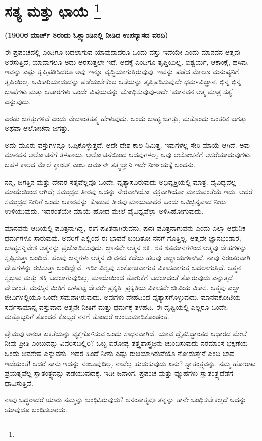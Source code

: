 
\chapter[ಸತ್ಯ ಮತ್ತು ಛಾಯೆ ]{ಸತ್ಯ ಮತ್ತು ಛಾಯೆ \protect\footnote{}}

\centerline{\textbf{(1900ರ ಮಾರ್ಚ್​ 8ರಂದು ಓಕ್ಲ್ಯಾಂಡಿನಲ್ಲಿ ನೀಡಿದ ಉಪನ್ಯಾಸದ ವರದಿ)}}

ಈ ಪ್ರಪಂಚದಲ್ಲಿ ಎಂದಿಗೂ ಬದಲಾಗುವ ಯಾವುದಾದರೂ ಒಂದು ವಸ್ತು ಇದೆಯೇ ಎಂದು ಮಾನವನ ಆತ್ಮವು ಅರಸುತ್ತಿದೆ; ಯಾವಾಗಲೂ ಅದು ಅರಸುತ್ತಲೇ ಇದೆ. ಅದಕ್ಕೆ ಎಂದಿಗೂ ತೃಪ್ತಿಯಿಲ್ಲ. ಐಶ್ವರ್ಯ, ಆಕಾಂಕ್ಷೆ, ಹಸಿವು, ಇವನ್ನು ಎಷ್ಟು ತೃಪ್ತಿಪಡಿಸಿದರೂ ಅವು ಇನ್ನೂ ವೃದ್ಧಿಯಾಗುತ್ತಿರುವುವು. ಇವನ್ನು ಪಡೆದ ಮೇಲೂ ಮನುಷ್ಯನಿಗೆ ತೃಪ್ತಿಯಿಲ್ಲ. ಅವಿಕಾರಿಯಾದುದನ್ನು ಪಡೆಯಬೇಕೆಂಬ ಆಸೆಯನ್ನು ತೃಪ್ತಿಪಡಿಸುವುದೇ ಧರ್ಮವಿಜ್ಞಾನ. ಭಿನ್ನ ಭಿನ್ನ ಭಾಷೆಗಳು ಮತ್ತು ಆಚಾರಗಳು ಒಂದೇ ವಿಷಯವನ್ನು ಬೋಧಿಸುವುವು-ಅದೇ ‘ಮಾನವನ ಆತ್ಮ ಮಾತ್ರ ಸತ್ಯ’ ಎನ್ನುವುದು.

ಎರಡು ಜಗತ್ತುಗಳಿವೆ ಎಂದು ವೇದಾಂತತತ್ತ್ವ ಹೇಳುವುದು. ಒಂದು ಬಾಹ್ಯ ಜಗತ್ತು, ಮತ್ತೊಂದು ಆಂತರಿಕ ಜಗತ್ತು ಅಥವಾ ಆಲೋಚನಾ ಜಗತ್ತು.

ಅದು ಮೂರು ವಸ್ತುಗಳನ್ನೂ ಒಪ್ಪಿಕೊಳ್ಳುತ್ತದೆ. ಅದೇ ದೇಶ ಕಾಲ ನಿಮಿತ್ತ. ಇವುಗಳೆಲ್ಲ ಸೇರಿ ಮಾಯೆ ಆಗಿದೆ. ಅವು ಮಾನವನ ಆಲೋಚನೆಗೆ ತಳಪಾಯ. ಆಲೋಚನೆಯಿಂದ ಆದವುಗಳಲ್ಲ, ಅವು ಆಲೋಚನೆಗೆ ಆಸರೆಯಾದುವುಗಳು. ಬಹಳ ಕಾಲದ ಮೇಲೆ ಕ್ಯಾಂಟ್​ ಎಂಬ ಜರ್ಮನ್​ ತತ್ತ್ವಜ್ಞಾನಿ ಇದೇ ನಿರ್ಣಯಕ್ಕೆ ಬಂದನು.

ನನ್ನ, ಜಗತ್ತಿನ ಮತ್ತು ದೇವರ ಸತ್ಯವೆಲ್ಲವೂ ಒಂದೇ. ವ್ಯತ್ಯಾಸವಿರುವುದು ಅಭಿವ್ಯಕ್ತಿಯಲ್ಲಿ ಮಾತ್ರ. ವೈವಿಧ್ಯವೆಲ್ಲ ಮಾಯೆಯಿಂದ ಆಗಿದೆ; ಸಮುದ್ರದ ತೀರವು ಅದನ್ನು ನೇರವಾಗಿಯೋ ವಕ್ರವಾಗಿಯೋ ಮಾಡುವಂತೆಯೆ ಇದು. ಆದರೆ ಸಮುದ್ರದ ನೀರಿಗೆ ಒಂದು ಆಕಾರವನ್ನು ಕೊಡುವ ತೀರವು ಮಾಯವಾದರೆ ಒಂದು ಅವಿಚ್ಛಿನ್ನವಾದ ನೀರು ಉಳಿಯುವುದು. ಇದರಂತೆಯೇ ಮಾಯೆ ಹೋದ ಮೇಲೆ ವೈವಿಧ್ಯವೆಲ್ಲಾ ಅಳಿಸಿ\break ಹೋಗುವುದು.

ಮಾನವನು ಆದಿಯಲ್ಲಿ ಪವಿತ್ರನಾಗಿದ್ದ, ಈಗ ಪತಿತನಾಗಿರುವನು, ಪುನಃ ಪವಿತ್ರನಾಗುವನು ಎಂದು ಎಲ್ಲಾ ಆಧುನಿಕ ಧರ್ಮಗಳೂ ಸಾರುವುವು. ಅವರಿಗೆ ಎಲ್ಲಿಂದ ಈ ಭಾವನೆ ಬಂದಿತೋ ನನಗೆ ಗೊತ್ತಿಲ್ಲ. ಆತ್ಮವೇ ಜ್ಞಾನಭಂಡಾರ; ಬಾಹ್ಯಸನ್ನಿವೇಶ ಆತ್ಮನನ್ನು ಪ್ರಚೋದಿಸುವುದು. ಜ್ಞಾನವೇ ಆತ್ಮನ ಶಕ್ತಿ. ಶತ ಶತಮಾನಗಳಿಂದ ಆತ್ಮವು ದೇಹಗಳನ್ನು ಸೃಷ್ಟಿಸುತ್ತಾ ಬಂದಿದೆ. ಹಲವು ಜನ್ಮಗಳು ಆತ್ಮನ ಜೀವನದ ಕಥೆಯ ಹಲವು ಅಧ್ಯಾಯಗಳಾಗಿವೆ. ನಾವು ನಿರಂತರವಾಗಿ ದೇಹಗಳನ್ನು ರಚಿಸುತ್ತಾ ಬಂದಿದ್ದೇವೆ. ಇಡೀ ವಿಶ್ವವು ಸಂಕೋಚವಾಗುತ್ತ ವಿಕಾಸವಾಗುತ್ತ ಬದಲಾಗುತ್ತಿದೆ. ಆತ್ಮನ ಸ್ವಭಾವ ಮತ್ತು ಶಕ್ತಿ ಬದಲಾಗುವುದಿಲ್ಲ. ಮಾಯೆಯಿಂದ ತೋರಿಕೆಗೆ ಬದಲಾದಂತೆ ತೋರುವುದು ಎನ್ನುತ್ತದೆ ವೇದಾಂತ. ಮನಸ್ಸಿನ ಮಿತಿಗೆ ಒಳಪಟ್ಟ ದೇವರೇ ಪ್ರಕೃತಿ. ಪ್ರಕೃತಿಯ ವಿಕಾಸವೇ ಜೀವಿಯ ವಿಕಾಸ. ಆತ್ಮವು ಎಲ್ಲಾ ಜೀವಿಗಳಲ್ಲಿಯೂ ಒಂದೇ ಸಮನಾಗಿರುವುದು. ಅವುಗಳು ದೇಹದಿಂದ ವ್ಯತ್ಯಾಸಗೊಳ್ಳುವುದು. ಮಾನವಕೋಟಿಯ ಸರ್ವಸಾಮಾನ್ಯ ವಸ್ತುವಾದ ಆತ್ಮನೇ ನೀತಿಗೆ ಮತ್ತು ಧರ್ಮಕ್ಕೆ ತಳಹದಿ. ಈ ದೃಷ್ಟಿಯಲ್ಲಿ ಎಲ್ಲರೂ ಒಂದೇ; ಮತ್ತೊಬ್ಬರಿಗೆ ತೊಂದರೆ ಕೊಟ್ಟರೆ ನನಗೆ ತೊಂದರೆ ಉಂಟುಮಾಡಿಕೊಂಡಂತೆ.

ಪ್ರೇಮವು ಅನಂತ ಏಕತೆಯನ್ನು ವ್ಯಕ್ತಗೊಳಿಸುವ ಒಂದು ಸಾಧನವಾಗಿದೆ. ಯಾವ ದ್ವೈತಸಿದ್ಧಾಂತದ ಆಧಾರದ ಮೇಲೆ ನೀವು ಪ್ರೀತಿ ಎಂಬುದನ್ನು ವಿವರಿಸಬಲ್ಲಿರಿ? ಒಬ್ಬ ಐರೋಪ್ಯ ತತ್ತ್ವಶಾಸ್ತ್ರಜ್ಞನು ಚುಂಬಿಸುವುದು ನರಮಾಂಸ ಭಕ್ಷಣೆಯ ಒಂದು ಅವಶೇಷ ಎನ್ನುವನು. ಇದರ ಹಿಂದೆ ನೀನು ಎಷ್ಟು ರುಚಿಯಾಗಿರುವೆಯೊ ನೋಡುತ್ತೇನೆ ಎಂಬ ಭಾವ ಇದೆಯಂತೆ! ಆದರೆ ನಾನು ಇದನ್ನು ನಂಬುವುದಿಲ್ಲ. ನಾವೆಲ್ಲ ಹುಡುಕುವುದು ಏನು? ಸ್ವಾತಂತ್ರ್ಯವನ್ನು. ನಮ್ಮ ಹೋರಾಟ ಪ್ರಯತ್ನವೆಲ್ಲ ಸ್ವಾತಂತ್ರ್ಯವನ್ನು ಪಡೆಯುವುದಕ್ಕೆ. ಇಡೀ ಜನಾಂಗ, ಪ್ರಪಂಚ ಮತ್ತು ವ್ಯೂಹಗಳು ಸ್ವಾತಂತ್ರ್ಯದೆಡೆಗೆ ಧಾವಿಸುತ್ತಿವೆ.

ನಾವು ಬದ್ಧರಾದರೆ ಯಾರು ನಮ್ಮನ್ನು ಬಂಧಿಸಿರುವುದು? ಅನಂತಾತ್ಮವೂ ತನ್ನನ್ನು ತಾನೇ ಬಂಧಿಸಬೇಕಲ್ಲದೆ ಅದನ್ನು ಯಾವುದೂ ಬಂಧಿಸಲಾರದು.


